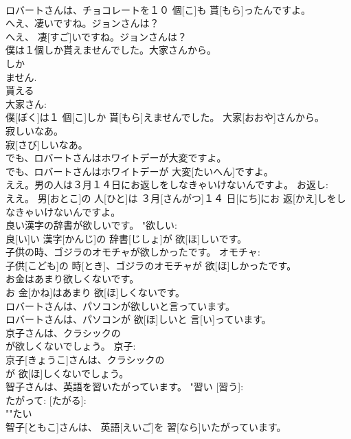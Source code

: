 \documentclass[8pt]{extreport}
\begin{document}
\begin{CJK}{UTF8}{min}
\\	ロバートさんは、チョコレートを１０ 個[こ]も 貰[もら]ったんですよ。	
\\	へえ、凄いですね。ジョンさんは？	
\\	へえ、 凄[すご]いですね。ジョンさんは？	
\\	僕は１個しか貰えませんでした。大家さんから。	
\\	しか 
\\	ません. 
\\	貰える 
\\	大家さん: 
\\	僕[ぼく]は１ 個[こ]しか 貰[もら]えませんでした。 大家[おおや]さんから。	
\\	寂しいなあ。	
\\	寂[さび]しいなあ。	
\\	でも、ロバートさんはホワイトデーが大変ですよ。	
\\	でも、ロバートさんはホワイトデーが 大変[たいへん]ですよ。	
\\	ええ。男の人は３月１４日にお返しをしなきゃいけないんですよ。	お返し: 
\\	ええ。 男[おとこ]の 人[ひと]は ３月[さんがつ]１４ 日[にち]にお 返[かえ]しをしなきゃいけないんですよ。	
\\	良い漢字の辞書が欲しいです。	"欲しい: 
\\	良[い]い 漢字[かんじ]の 辞書[じしょ]が 欲[ほ]しいです。	
\\	子供の時、ゴジラのオモチャが欲しかったです。	オモチャ: 
\\	子供[こども]の 時[とき]、ゴジラのオモチャが 欲[ほ]しかったです。	
\\	お金はあまり欲しくないです。	
\\	お 金[かね]はあまり 欲[ほ]しくないです。	
\\	ロバートさんは、パソコンが欲しいと言っています。	
\\	ロバートさんは、パソコンが 欲[ほ]しいと 言[い]っています。	
\\	京子さんは、クラシックの
\\	が欲しくないでしょう。	京子: 
\\	京子[きょうこ]さんは、クラシックの 
\\	が 欲[ほ]しくないでしょう。	
\\	智子さんは、英語を習いたがっています。	"習い [習う]: 
\\	たがって: [たがる]: 
\\	""たい
\\	智子[ともこ]さんは、 英語[えいご]を 習[なら]いたがっています。	

\end{CJK}
\end{document}
